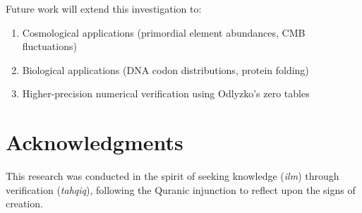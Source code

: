 \documentclass[12pt,a4paper]{article}
\begin{document}
Future work will extend this investigation to:
\begin{enumerate}
    \item Cosmological applications (primordial element abundances, CMB fluctuations)
    \item Biological applications (DNA codon distributions, protein folding)
    \item Higher-precision numerical verification using Odlyzko's zero tables
\end{enumerate}

\section*{Acknowledgments}

This research was conducted in the spirit of seeking knowledge (\textit{ilm}) through verification (\textit{tahqiq}), following the Quranic injunction to reflect upon the signs of creation.



\end{document}
